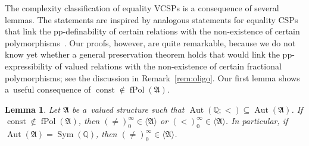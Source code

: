 \documentclass[preprint,12pt]{elsarticle}
\newcommand{\Q}{\mathbb Q}
\newcommand{\bA}{{\mathfrak A}}
\newcommand{\checked}[1]{#1}
\DeclareMathOperator{\Aut}{Aut}
\DeclareMathOperator{\fPol}{fPol}
\DeclareMathOperator{\Sym}{Sym}
\DeclareMathOperator{\const}{const}
\newtheorem{lemma}[theorem]{Lemma}
\begin{document}
The complexity classification of equality VCSPs is a consequence of several lemmas. The statements are inspired by analogous statements for equality CSPs that link the pp-definability of certain relations with the non-existence of certain polymorphisms~\cite{ecsps}. Our proofs, however, 
are quite remarkable, because we do not know yet whether a general preservation theorem holds that would link the pp-\checked{expressibility} of valued relations with the non-existence of \checked{certain} fractional polymorphisms; 
see the discussion in Remark~\ref{rem:oligo}.
\checked{Our first lemma shows a~useful consequence of $\const \notin \fPol(\bA)$.}

\begin{lemma}\label{lem:no-const-temp}
Let $\bA$ be a~valued structure such that $\Aut(\Q; <)\subseteq \Aut(\bA)$.
If $\const \notin \fPol(\bA)$, 
then 
$(\neq)_0^\infty \in \langle \bA \rangle$ or $(<)_0^\infty \in \langle \bA \rangle$. In particular, if $\Aut(\bA)=\Sym(\Q)$, then $(\neq)_0^\infty \in \langle \bA \rangle$. 
\end{lemma}
\end{document}
